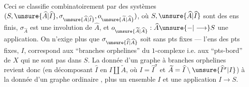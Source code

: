 Ceci se classifie combinatoirement par des systèmes $(S,\unsure{\widehat A|\widehat I},\sigma_{\unsure{\widehat A|\widehat I}},o_{\unsure{\widetilde A|\widehat A}})$, où  $S,\unsure{\widehat A|\widehat I}$ sont des ens finis, $\sigma_{\widehat A}$ est une involution de $\widehat A$, et $o_{\unsure{\widetilde A|\widehat A}}:\widehat A\unsure{-|\longrightarrow}S$ une
application. On n'exige plus que $\sigma_{\unsure{\widehat I|\widehat A}}$ soit sans pts fixes — l'ens des pts fixes, $I$,  correspond aux ``branches orphelines'' du $1$-complexe i.e. aux  ``pts-bord'' de $X$ qui ne sont pas dans $S$. La donnée d'un graphe à branches orphelines revient donc (en décomposant $\widehat I$ en $I\amalg\widetilde A$, où $I=\widehat I^\sigma$ et $\widetilde A=\widehat I\setminus\unsure{\widehat I^\sigma|I}$) à la donnée d'un  graphe ordinaire , plus un ensemble $I$ et une application $I\longrightarrow S$.

